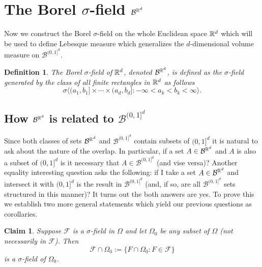 \documentclass[10pt,letterpaper,twocolumn]{article}
\newtheorem{claim}{Claim}
\newtheorem{definition}{Definition}
\begin{document}
\section{The Borel $\sigma$-field $\mathcal B^{\Bbb R^d}$}

Now we construct the Borel $\sigma$-field on the whole Euclidean space $\Bbb R^d$ which will be used to define Lebesque measure which generalizes the $d$-dimensional volume measure on $\mathcal B^{(0,1]^d}$.

\begin{definition} The Borel $\sigma$-field of $\Bbb R^d$, denoted $\mathcal B^{\Bbb R^d}$, is defined as the $\sigma$-field generated by the class of all finite rectangles in $\Bbb R^d$ as follows
\[ \sigma\bigl\langle (a_1,b_1]\times \cdots \times (a_d,b_d]: -\infty< a_k < b_k<\infty \bigr\rangle. \]
\end{definition}



\subsection{How  $\mathcal B^{\Bbb R^d} $ is related to $\mathcal B^{(0,1]^d}$}
Since both classes of sets  $\mathcal B^{\Bbb R^d} $ and $\mathcal B^{(0,1]^d}$ contain subsets of $(0,1]^d$ it is natural to ask about  the nature of the overlap. In particular, if a set $A\in \mathcal B^{\Bbb R^d}$ and $A$ is also a subset of $(0,1]^d$ is it necessary that $A\in\mathcal B^{(0,1]^d}$ (and vise versa)? Another equality interesting question asks the following: if I take a set $A\in \mathcal B^{\Bbb R^d}$ and intersect it with $(0,1]^d$ is the result in $\mathcal B^{(0,1]^d}$ (and, if so, are all $\mathcal B^{(0,1]^d}$ sets structured in this manner)? It turns out the both answers are yes. To prove this we establish two  more general statements which yield our previous questions as corollaries.


\begin{claim}
\label{ccc}
Suppose $\mathcal F$ is a $\sigma$-field in $\Omega$ and let $\Omega_0$ be any subset of $\Omega$ (not necessarily in $\mathcal F$). Then
\[\mathcal F\cap \Omega_0 := \{ F\cap \Omega_0: F\in \mathcal F\}\]
 is a $\sigma$-field of $\Omega_0$.
\end{claim}
\end{document}
